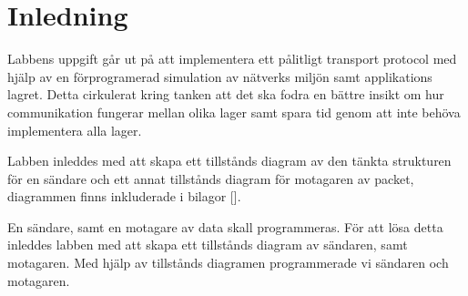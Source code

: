 \section{Inledning}

Labbens uppgift går ut på att implementera ett pålitligt transport protocol med hjälp av en
förprogramerad simulation av nätverks miljön samt applikations lagret. Detta cirkulerat kring
tanken att det ska fodra en bättre insikt om hur communikation fungerar mellan olika lager samt
spara tid genom att inte behöva implementera alla lager. 

Labben inleddes med att skapa ett tillstånds diagram av den tänkta strukturen för en sändare och
ett annat tillstånds diagram för motagaren av packet, diagrammen finns inkluderade i bilagor [].

En sändare, samt en motagare av data skall programmeras. För att lösa detta inleddes
labben med att skapa ett tillstånds diagram av sändaren, samt motagaren.
 Med hjälp av tillstånds diagramen programmerade vi sändaren och motagaren.

